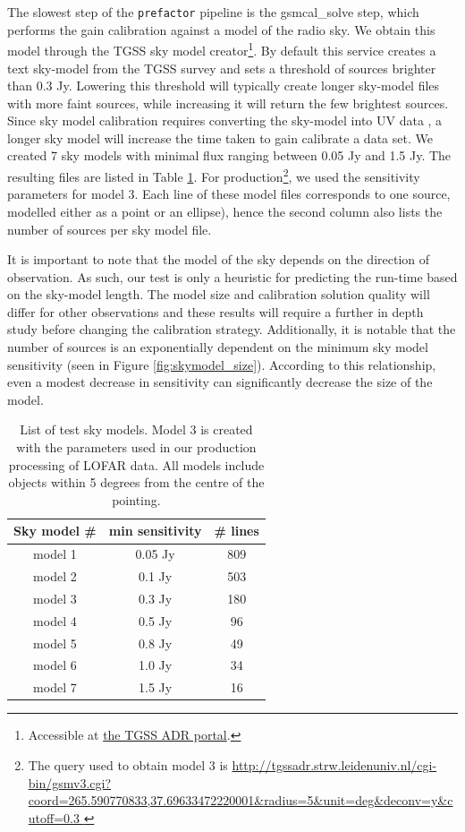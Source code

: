 The slowest step of the \texttt{prefactor} pipeline is the gsmcal\_solve step, which performs the gain calibration against a model of the radio sky. We obtain this model through the TGSS sky model creator\footnote{Accessible at \href{http://tgssadr.strw.leidenuniv.nl/doku.php}{the TGSS ADR portal}.}. By default this service creates a text sky-model from the TGSS survey \citep{tgssadr} and sets a threshold of sources brighter than 0.3 Jy. Lowering this threshold will typically  create longer sky-model files with more faint sources, while increasing it will return the few brightest sources. Since sky model calibration requires converting the sky-model into UV data \citep{dppp}, a longer sky model will increase the time taken to gain calibrate a data set. We created 7 sky models with minimal flux ranging between 0.05 Jy and 1.5 Jy. The resulting files are listed in Table \ref{table:skymodels}. For production\footnote{The query used to obtain model 3 is \url{http://tgssadr.strw.leidenuniv.nl/cgi-bin/gsmv3.cgi?coord=265.590770833,37.69633472220001\&radius=5\&unit=deg\&deconv=y\&cutoff=0.3 }}, we used the sensitivity parameters for model 3. Each line of these model files corresponds to one source, modelled either as a point or an ellipse), hence the second column also lists the number of sources per sky model file.

It is important to note that the model of the sky depends on the direction of observation. As such, our test is only a heuristic for predicting the run-time based on the sky-model length. The model size and calibration solution quality will differ for other observations and these results will require a further in depth study before changing the calibration strategy. Additionally, it is notable that the number of sources is an exponentially dependent on the minimum sky model sensitivity (seen in Figure \ref{fig:skymodel_size}). According to this relationship, even a modest decrease in sensitivity can significantly decrease the size of the model.

\begin{table}[h!]
\centering
\begin{tabular}{||c| c c||} 
 \hline
 Sky model \# & min sensitivity & \# lines  \\ [0.5ex] 
 \hline
 model 1 & 0.05 Jy & 809    \\ 
 model 2 & 0.1 Jy & 503   \\
 \rowcolor{Gray}
  \hline
 model 3 & 0.3 Jy & 180   \\
  \hline
 model 4 & 0.5 Jy & 96  \\
 model 5 & 0.8 Jy & 49   \\ 
 model 6 & 1.0 Jy & 34   \\
 model 7 & 1.5 Jy & 16   \\[1ex] 
 \hline
\end{tabular}
\caption{List of test sky models. Model 3 is created with the parameters used in our production processing of LOFAR data. All models include objects within 5 degrees from the centre of the pointing.  }
\label{table:skymodels}
\end{table}


